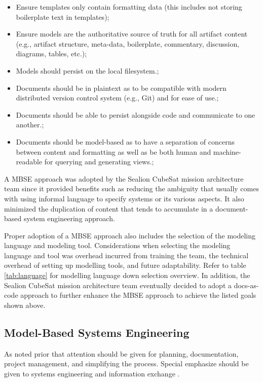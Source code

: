 \documentclass[journal,article,submit,pdftex,moreauthors]{Definitions/mdpi}
\begin{document}
\begin{itemize}
	\item	Ensure templates only contain formatting data (this includes not storing boilerplate text in templates);
	\item	Ensure models are the authoritative source of truth for all artifact content (e.g., artifact structure, meta-data, boilerplate, commentary, discussion, diagrams, tables, etc.);
	\item 	Models should persist on the local filesystem.;
	\item 	Documents should be in plaintext as to be compatible with modern distributed version control system (e.g., Git) and for ease of use.;
	\item 	Documents should be able to persist alongside code and communicate to one another.;
	\item 	Documents should be model-based as to have a separation of concerns between content and formatting as well as be both human and machine-readable for querying and generating views.;
\end{itemize}

A MBSE approach was adopted by the Sealion CubeSat mission architecture team since it provided benefits such as reducing the ambiguity that usually comes with using informal language to specify systems or its various aspects.  It also minimized the duplication of content that tends to accumulate in a document-based system engineering approach.

Proper adoption of a MBSE approach also includes the selection of the modeling language and modeling tool.  Considerations when selecting the modeling language and tool was overhead incurred from training the team, the technical overhead of setting up modelling tools, and future adaptability.  Refer to table \ref{tab:language} for modelling language down selection overview.  In addition, the Sealion CubeSat mission architecture team eventually decided to adopt a docs-as-code approach to further enhance the MBSE approach to achieve the listed goals shown above.

\subsection{Model-Based Systems Engineering}
As noted prior that attention should be given for planning, documentation, project management, and simplifying the process.  Special emphasize should be given to systems engineering and information exchange \cite{aalto}.
\end{document}
